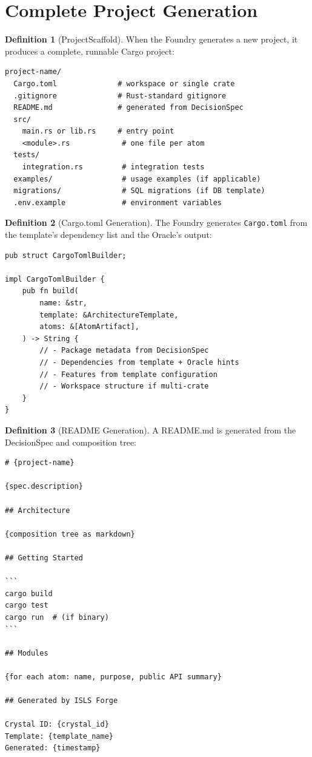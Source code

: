 \documentclass[11pt,a4paper,twoside]{article}
\theoremstyle{definition}
\newtheorem{definition}{Definition}[section]
\theoremstyle{plain}
\theoremstyle{remark}
\begin{document}
\section{Complete Project Generation}\label{sec:projgen}

\begin{definition}[ProjectScaffold]\label{def:scaffold}
When the Foundry generates a new project, it produces a complete,
runnable Cargo project:
\begin{lstlisting}
project-name/
  Cargo.toml              # workspace or single crate
  .gitignore              # Rust-standard gitignore
  README.md               # generated from DecisionSpec
  src/
    main.rs or lib.rs     # entry point
    <module>.rs            # one file per atom
  tests/
    integration.rs         # integration tests
  examples/                # usage examples (if applicable)
  migrations/              # SQL migrations (if DB template)
  .env.example             # environment variables
\end{lstlisting}
\end{definition}

\begin{definition}[Cargo.toml Generation]\label{def:cargotoml}
The Foundry generates \texttt{Cargo.toml} from the template's
dependency list and the Oracle's output:
\begin{lstlisting}
pub struct CargoTomlBuilder;

impl CargoTomlBuilder {
    pub fn build(
        name: &str,
        template: &ArchitectureTemplate,
        atoms: &[AtomArtifact],
    ) -> String {
        // - Package metadata from DecisionSpec
        // - Dependencies from template + Oracle hints
        // - Features from template configuration
        // - Workspace structure if multi-crate
    }
}
\end{lstlisting}
\end{definition}

\begin{definition}[README Generation]\label{def:readme}
A README.md is generated from the DecisionSpec and composition tree:
\begin{lstlisting}
# {project-name}

{spec.description}

## Architecture

{composition tree as markdown}

## Getting Started

```
cargo build
cargo test
cargo run  # (if binary)
```

## Modules

{for each atom: name, purpose, public API summary}

## Generated by ISLS Forge

Crystal ID: {crystal_id}
Template: {template_name}
Generated: {timestamp}
\end{lstlisting}
\end{definition}
\end{document}
